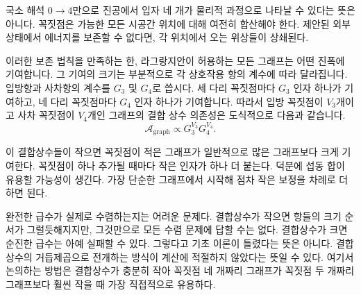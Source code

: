 국소 해석 \(0\to4\)만으로 진공에서 입자 네 개가 물리적 과정으로 나타날 수 있다는 뜻은 아니다. 꼭짓점은 가능한 모든 시공간 위치에 대해 여전히 합산해야 한다. 제안된 외부 상태에서 에너지를 보존할 수 없다면, 각 위치에서 오는 위상들이 상쇄된다.

\begin{classroomqa}
\end{classroomqa}

\begin{classroomqa}
\end{classroomqa}

이러한 보존 법칙을 만족하는 한, 라그랑지안이 허용하는 모든 그래프는 어떤 진폭에 기여합니다. 그 기여의 크기는 부분적으로 각 상호작용 항의 계수에 따라 달라집니다. 입방항과 사차항의 계수를 \(G_3\) 및 \(G_4\)로 씁시다. 세 다리 꼭짓점마다 \(G_3\) 인자 하나가 기여하고, 네 다리 꼭짓점마다 \(G_4\) 인자 하나가 기여합니다. 따라서 입방 꼭짓점이 \(V_3\)개이고 사차 꼭짓점이 \(V_4\)개인 그래프의 결합 상수 의존성은 도식적으로 다음과 같습니다.
\begin{equation}
\mathcal{A}_{\mathrm{graph}}
\propto G_3^{V_3}G_4^{V_4}.
\end{equation}

이 결합상수들이 작으면 꼭짓점이 적은 그래프가 일반적으로 많은 그래프보다 크게 기여한다. 꼭짓점이 하나 추가될 때마다 작은 인자가 하나 더 붙는다. 덕분에 섭동 합이 유용할 가능성이 생긴다. 가장 단순한 그래프에서 시작해 점차 작은 보정을 차례로 더하면 된다.

완전한 급수가 실제로 수렴하는지는 어려운 문제다. 결합상수가 작으면 항들의 크기 순서가 그럴듯해지지만, 그것만으로 모든 수렴 문제에 답할 수는 없다. 결합상수가 크면 순진한 급수는 아예 실패할 수 있다. 그렇다고 기초 이론이 틀렸다는 뜻은 아니다. 결합상수의 거듭제곱으로 전개하는 방식이 계산에 적절하지 않았다는 뜻일 수 있다. 여기서 논의하는 방법은 결합상수가 충분히 작아 꼭짓점 네 개짜리 그래프가 꼭짓점 두 개짜리 그래프보다 훨씬 작을 때 가장 직접적으로 유용하다.

